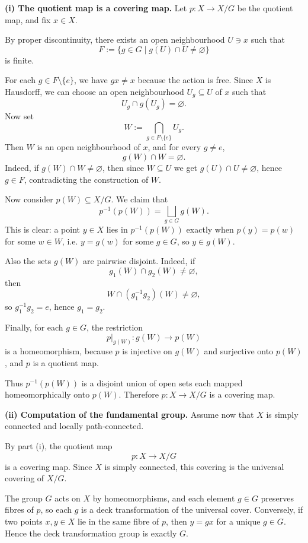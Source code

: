 \begin{solution}
\textbf{(i) The quotient map is a covering map.}
Let \(p:X\to X/G\) be the quotient map, and fix \(x\in X\).

By proper discontinuity, there exists an open neighbourhood \(U\ni x\) such that
\[
F:=\{g\in G\mid g(U)\cap U\neq \varnothing\}
\]
is finite.

For each \(g\in F\setminus\{e\}\), we have \(gx\neq x\) because the action is free. Since \(X\) is Hausdorff, we can choose an open neighbourhood \(U_g\subseteq U\) of \(x\) such that
\[
U_g\cap g(U_g)=\varnothing.
\]
Now set
\[
W:=\bigcap_{g\in F\setminus\{e\}} U_g.
\]
Then \(W\) is an open neighbourhood of \(x\), and for every \(g\neq e\),
\[
g(W)\cap W=\varnothing.
\]
Indeed, if \(g(W)\cap W\neq\varnothing\), then since \(W\subseteq U\) we get \(g(U)\cap U\neq\varnothing\), hence \(g\in F\), contradicting the construction of \(W\).

Now consider \(p(W)\subseteq X/G\). We claim that
\[
p^{-1}(p(W))=\bigsqcup_{g\in G} g(W).
\]
This is clear: a point \(y\in X\) lies in \(p^{-1}(p(W))\) exactly when \(p(y)=p(w)\) for some \(w\in W\), i.e. \(y=g(w)\) for some \(g\in G\), so \(y\in g(W)\).

Also the sets \(g(W)\) are pairwise disjoint. Indeed, if
\[
g_1(W)\cap g_2(W)\neq\varnothing,
\]
then
\[
W\cap (g_1^{-1}g_2)(W)\neq\varnothing,
\]
so \(g_1^{-1}g_2=e\), hence \(g_1=g_2\).

Finally, for each \(g\in G\), the restriction
\[
p|_{g(W)}:g(W)\to p(W)
\]
is a homeomorphism, because \(p\) is injective on \(g(W)\) and surjective onto \(p(W)\), and \(p\) is a quotient map.

Thus \(p^{-1}(p(W))\) is a disjoint union of open sets each mapped homeomorphically onto \(p(W)\). Therefore \(p:X\to X/G\) is a covering map.

\textbf{(ii) Computation of the fundamental group.}
Assume now that \(X\) is simply connected and locally path-connected.

By part (i), the quotient map
\[
p:X\to X/G
\]
is a covering map. Since \(X\) is simply connected, this covering is the universal covering of \(X/G\).

The group \(G\) acts on \(X\) by homeomorphisms, and each element \(g\in G\) preserves fibres of \(p\), so each \(g\) is a deck transformation of the universal cover. Conversely, if two points \(x,y\in X\) lie in the same fibre of \(p\), then \(y=gx\) for a unique \(g\in G\). Hence the deck transformation group is exactly \(G\).


\end{solution}
